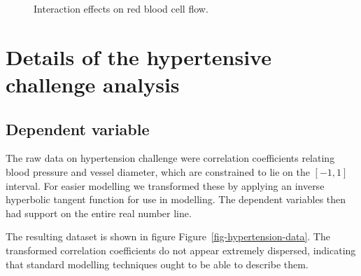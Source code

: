 \documentclass[
  letterpaper,
  DIV=11,
  numbers=noendperiod,
  oneside]{scrartcl}
\theoremstyle{plain}
\theoremstyle{remark}
\begin{document}
\begin{figure}


\caption{\label{fig-flow-interaction}Interaction effects on red blood
cell flow.}

\end{figure}%

\section{Details of the hypertensive challenge
analysis}\label{details-of-the-hypertensive-challenge-analysis}

\subsection{Dependent variable}\label{dependent-variable-3}

The raw data on hypertension challenge were correlation coefficients
relating blood pressure and vessel diameter, which are constrained to
lie on the \([-1,
1]\) interval. For easier modelling we transformed these by applying an
inverse hyperbolic tangent function for use in modelling. The dependent
variables then had support on the entire real number line.

The resulting dataset is shown in figure
Figure~\ref{fig-hypertension-data}. The transformed correlation
coefficients do not appear extremely dispersed, indicating that standard
modelling techniques ought to be able to describe them.
\end{document}
